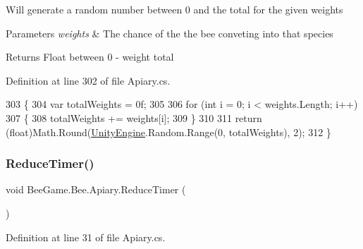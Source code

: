 Will generate a random number between 0 and the total for the given weights 


\begin{DoxyParams}{Parameters}
{\em weights} & The chance of the the bee conveting into that species\\
\hline
\end{DoxyParams}
\begin{DoxyReturn}{Returns}
Float between 0 -\/ weight total
\end{DoxyReturn}


Definition at line 302 of file Apiary.\+cs.


\begin{DoxyCode}
303         \{
304             var totalWeights = 0f;
305 
306             \textcolor{keywordflow}{for} (\textcolor{keywordtype}{int} i = 0; i < weights.Length; i++)
307             \{
308                 totalWeights += weights[i];
309             \}
310 
311             \textcolor{keywordflow}{return} (\textcolor{keywordtype}{float})Math.Round(\hyperlink{namespace_unity_engine}{UnityEngine}.Random.Range(0, totalWeights), 2);
312         \}
\end{DoxyCode}
\mbox{\label{class_bee_game_1_1_bee_1_1_apiary_a13ae008ce398b022806823585c6eb6de}} 
\subsubsection{\texorpdfstring{Reduce\+Timer()}{ReduceTimer()}}
{\footnotesize\ttfamily void Bee\+Game.\+Bee.\+Apiary.\+Reduce\+Timer (\begin{DoxyParamCaption}{ }\end{DoxyParamCaption})\hspace{0.3cm}{\ttfamily [private]}}



Definition at line 31 of file Apiary.\+cs.


